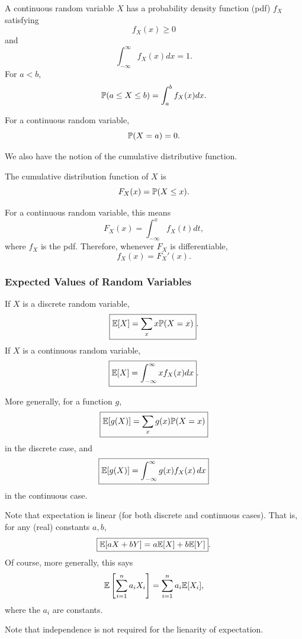 \begin{df}
A continuous random variable $X$ has a probability density function (pdf) $f_X$
satisfying
\[
f_X(x)\geq0
\]
and
\[
\int_{-\infty}^{\infty}f_X(x) dx=1.
\]
For $a<b$,
\[
\mathbb{P}(a\leq X\leq b) = \int_a^b f_X(x) dx.
\]
\end{df}

\begin{remark}
For a continuous random variable,
\[
\mathbb{P}(X=a)=0.
\]
\end{remark}

We also have the notion of the cumulative distributive function.

\begin{df}
The cumulative distribution function of $X$ is
\[
F_X(x)=\mathbb{P}(X\leq x).
\]
\end{df}

\begin{remark}
For a continuous random variable, this means
\[
F_X(x)
=
\int_{-\infty}^x f_X(t) dt,
\]
where $f_X$ is the pdf. Therefore, whenever $F_X$ is differentiable,
\[
f_X(x)=F_X'(x).
\]
\end{remark}

\subsubsection{Expected Values of Random Variables}

If $X$ is a discrete random variable,
\[
\boxed{\mathbb{E}[X] =\sum_x x\mathbb{P}(X=x)}.
\]
If $X$ is a continuous random variable,
\[
\boxed{\mathbb{E}[X] =\int_{-\infty}^{\infty}x f_X(x) dx}.
\]

\begin{remark}
More generally, for a function $g$,
\[
\boxed{\mathbb{E}[g(X)]
=
\sum_x g(x)\mathbb{P}(X=x)}
\]
in the discrete case, and
\[
\boxed{\mathbb{E}[g(X)]
=
\int_{-\infty}^{\infty}g(x)f_X(x)\,dx}
\]
in the continuous case.
\end{remark}

Note that expectation is linear (for both discrete and continuous cases). 
That is, for any (real) constants $a,b$,
\[
\boxed{\mathbb{E}[aX+bY] = a\mathbb{E}[X]+b\mathbb{E}[Y]}.
\]
Of course, more generally, this says
\[
\mathbb{E}\left[\sum_{i=1}^n a_iX_i\right]
=
\sum_{i=1}^na_i\mathbb{E}[X_i],
\]
where the $a_i$ are constants.

\begin{remark}
Note that independence is not required for the lienarity of expectation.
\end{remark}


